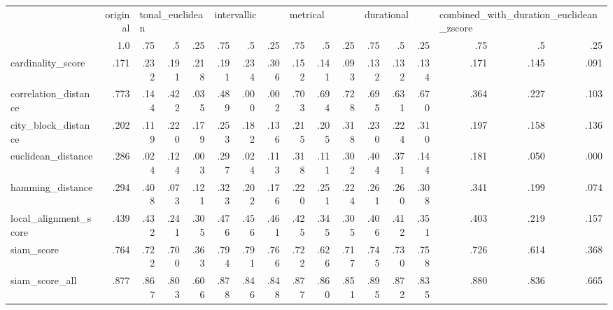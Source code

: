 \begin{tabular}{lrrrrrrrrrrrrrrrr}
\toprule
{} & original & \multicolumn{3}{l}{tonal\_euclidean} & \multicolumn{3}{l}{intervallic} & \multicolumn{3}{l}{metrical} & \multicolumn{3}{l}{durational} & \multicolumn{3}{l}{combined\_with\_duration\_euclidean\_zscore} \\
{} & 1.0 & .75 & .5 & .25 & .75 & .5 & .25 & .75 & .5 & .25 & .75 & .5 & .25 & .75 & .5 & .25 \\
\midrule
cardinality\_score     & .171 & .232 & .191 & .218 & .191 & .234 & .306 & .152 & .141 & .093 & .132 & .132 & .134 & .171 & .145 & .091 \\
correlation\_distance  & .773 & .144 & .422 & .035 & .489 & .000 & .002 & .703 & .694 & .728 & .695 & .631 & .670 & .364 & .227 & .103 \\
city\_block\_distance   & .202 & .119 & .220 & .179 & .253 & .182 & .136 & .215 & .205 & .318 & .230 & .224 & .310 & .197 & .158 & .136 \\
euclidean\_distance    & .286 & .024 & .124 & .003 & .297 & .024 & .113 & .318 & .111 & .302 & .404 & .371 & .144 & .181 & .050 & .000 \\
hamming\_distance      & .294 & .408 & .073 & .121 & .323 & .202 & .176 & .220 & .251 & .224 & .261 & .260 & .308 & .341 & .199 & .074 \\
local\_alignment\_score & .439 & .432 & .241 & .305 & .476 & .456 & .461 & .425 & .345 & .305 & .406 & .412 & .351 & .403 & .219 & .157 \\
siam\_score            & .764 & .722 & .700 & .363 & .794 & .791 & .766 & .722 & .626 & .717 & .745 & .730 & .758 & .726 & .614 & .368 \\
siam\_score\_all        & .877 & .867 & .803 & .606 & .878 & .846 & .848 & .877 & .860 & .851 & .895 & .872 & .835 & .880 & .836 & .665 \\
\bottomrule
\end{tabular}

